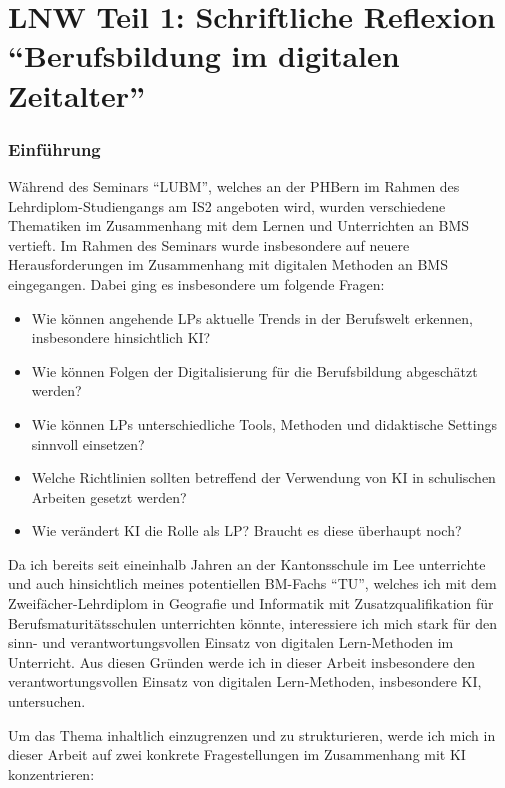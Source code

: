 \part*{\acrshort{LNW} Teil 1: Schriftliche Reflexion\\``Berufsbildung im digitalen Zeitalter''}

\section{Einführung}
Während des  Seminars ``\gls{LUBM}'', welches an der PHBern im Rahmen des Lehrdiplom-Studiengangs am \gls{IS2} angeboten wird, wurden verschiedene Thematiken im Zusammenhang mit dem Lernen und Unterrichten an \gls{BMS} vertieft. Im Rahmen des Seminars wurde insbesondere auf neuere Herausforderungen im Zusammenhang mit digitalen Methoden an \gls{BMS} eingegangen. Dabei ging es insbesondere um folgende Fragen:

\begin{itemize}
\item Wie können angehende \glspl{LP} aktuelle Trends in der Berufswelt erkennen, insbesondere hinsichtlich \gls{KI}?
\item Wie können Folgen der Digitalisierung für die Berufsbildung abgeschätzt werden?
\item Wie können \glspl{LP} unterschiedliche Tools, Methoden und didaktische Settings sinnvoll einsetzen?
\item Welche Richtlinien sollten betreffend der Verwendung von \gls{KI} in schulischen Arbeiten gesetzt werden?
\item Wie verändert \gls{KI} die Rolle als \gls{LP}? Braucht es diese überhaupt noch?
\end{itemize}

Da ich bereits seit eineinhalb Jahren an der Kantonsschule im Lee unterrichte und auch hinsichtlich meines potentiellen \gls{BM}-Fachs ``\gls{TU}'', welches ich mit dem Zweifächer-Lehrdiplom in Geografie und Informatik mit Zusatzqualifikation für Berufsmaturitätsschulen unterrichten könnte, interessiere ich mich stark für den sinn- und verantwortungsvollen Einsatz von digitalen Lern-Methoden im Unterricht. Aus diesen Gründen werde ich in dieser Arbeit insbesondere den verantwortungsvollen Einsatz von digitalen Lern-Methoden, insbesondere \gls{KI}, untersuchen. 

Um das Thema inhaltlich einzugrenzen und zu strukturieren, werde ich mich in dieser Arbeit auf zwei konkrete Fragestellungen im Zusammenhang mit \gls{KI} konzentrieren:


